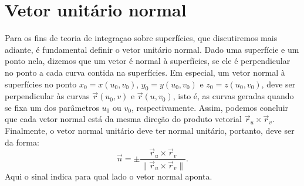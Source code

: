 \section{Vetor unitário normal}
Para os fins de teoria de integraçao sobre superfícies, que discutiremos mais adiante, é fundamental definir o vetor unitário normal. Dado uma superfície e um ponto nela, dizemos que um vetor é normal à superfícies, se ele é perpendicular no ponto a cada curva contida na superfícies. Em especial, um vetor normal à superfícies no ponto $x_0=x(u_0,v_0)$, $y_0=y(u_0,v_0)$ e $z_0=z(u_0,v_0)$, deve ser perpendicular às curvas $\vec{r}(u_0,v)$ e $\vec{r}(u,v_0)$, isto é, as curvas geradas quando se fixa um dos parâmetros $u_0$ ou $v_0$, respectivamente. Assim, podemos concluir que cada vetor normal está da mesma direção do produto vetorial $\vec{r}_u\times\vec{r}_v$. Finalmente, o vetor normal unitário deve ter normal unitário, portanto, deve ser da forma:
\begin{equation}
 \vec{n} = \pm \frac{\vec{r}_u\times\vec{r}_v}{\|\vec{r}_u\times\vec{r}_v\|}.
\end{equation}
Aqui o sinal indica para qual lado o vetor normal aponta.











%